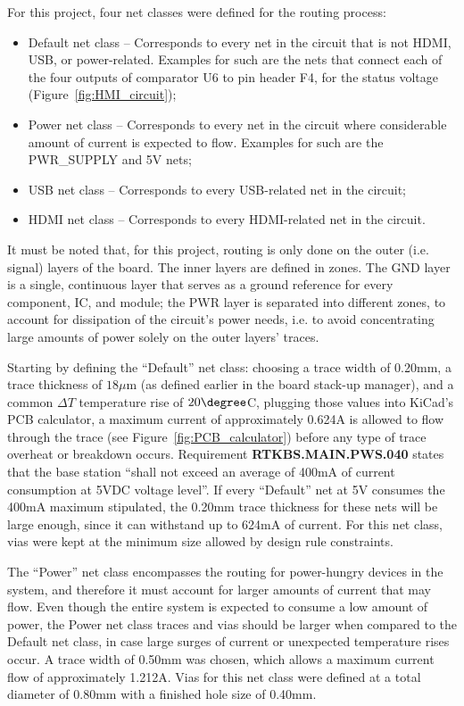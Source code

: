 For this project, four net classes were defined for the routing process:

\begin{itemize}
	\item Default net class -- Corresponds to every net in the circuit that is not HDMI, USB, or power-related. Examples for such are the nets that connect each of the four outputs of comparator U6 to pin header F4, for the status voltage (Figure~\ref{fig:HMI_circuit});
	
	\item Power net class -- Corresponds to every net in the circuit where considerable amount of current is expected to flow. Examples for such are the PWR\_SUPPLY and 5V nets;
	
	\item USB net class -- Corresponds to every USB-related net in the circuit;
	
	\item HDMI net class -- Corresponds to every HDMI-related net in the circuit.
\end{itemize}

It must be noted that, for this project, routing is only done on the outer (i.e. signal) layers of the board. The inner layers are defined in zones. The GND layer is a single, continuous layer that serves as a ground reference for every component, IC, and module; the PWR layer is separated into different zones, to account for dissipation of the circuit's power needs, i.e. to avoid concentrating large amounts of power solely on the outer layers' traces.

Starting by defining the ``Default'' net class: choosing a trace width of 0.20mm, a trace thickness of $18 \mu$m (as defined earlier in the board stack-up manager), and a common $\Delta T$ temperature rise of $20 \degree$C, plugging those values into KiCad's PCB calculator, a maximum current of approximately 0.624A is allowed to flow through the trace (see Figure~\ref{fig:PCB_calculator}) before any type of trace overheat or breakdown occurs. Requirement \textbf{RTKBS.MAIN.PWS.040} states that the base station ``shall not exceed an average of 400mA of current consumption at 5VDC voltage level''. If every ``Default'' net at 5V consumes the 400mA maximum stipulated, the 0.20mm trace thickness for these nets will be large enough, since it can withstand up to 624mA of current. For this net class, vias were kept at the minimum size allowed by design rule constraints.

The ``Power'' net class encompasses the routing for power-hungry devices in the system, and therefore it must account for larger amounts of current that may flow. Even though the entire system is expected to consume a low amount of power, the Power net class traces and vias should be larger when compared to the Default net class, in case large surges of current or unexpected temperature rises occur. A trace width of 0.50mm was chosen, which allows a maximum current flow of approximately 1.212A. Vias for this net class were defined at a total diameter of 0.80mm with a finished hole size of 0.40mm.

